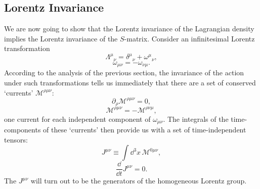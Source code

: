 
\subsection{Lorentz Invariance}

We are now going to show that the Lorentz invariance of the Lagrangian density
implies the Lorentz invariance of the $S$-matrix. Consider an infinitesimal
Lorentz transformation
\begin{equation}
\Lambda^\mu{}_\nu=\delta^\mu{}_\nu+\omega^\mu{}_\nu,
\tag{7.4.1}\label{eq:7.4.1}
\end{equation}
\begin{equation}
\omega_{\mu\nu}=-\omega_{\nu\mu}.
\tag{7.4.2}\label{eq:7.4.2}
\end{equation}
According to the analysis of the previous section, the invariance of the
action under such transformations tells us immediately that there are a set of
conserved `currents' $\mathcal{M}^{\rho\mu\nu}$:
\begin{equation}
\partial_\rho\mathcal{M}^{\rho\mu\nu}=0,
\tag{7.4.3}\label{eq:7.4.3}
\end{equation}
\begin{equation}
\mathcal{M}^{\rho\mu\nu}=-\mathcal{M}^{\rho\nu\mu},
\tag{7.4.4}\label{eq:7.4.4}
\end{equation}
one current for each independent component of $\omega_{\mu\nu}$. The integrals
of the time-components of these `currents' then provide us with a set of
time-independent tensors:
\begin{equation}
J^{\mu\nu}\equiv\int \dd^3x\,\mathcal{M}^{0\mu\nu},
\tag{7.4.5}\label{eq:7.4.5}
\end{equation}
\begin{equation}
\frac{\dd}{\dd t}J^{\mu\nu}=0.
\tag{7.4.6}\label{eq:7.4.6}
\end{equation}
The $J^{\mu\nu}$ will turn out to be the generators of the homogeneous Lorentz
group.

